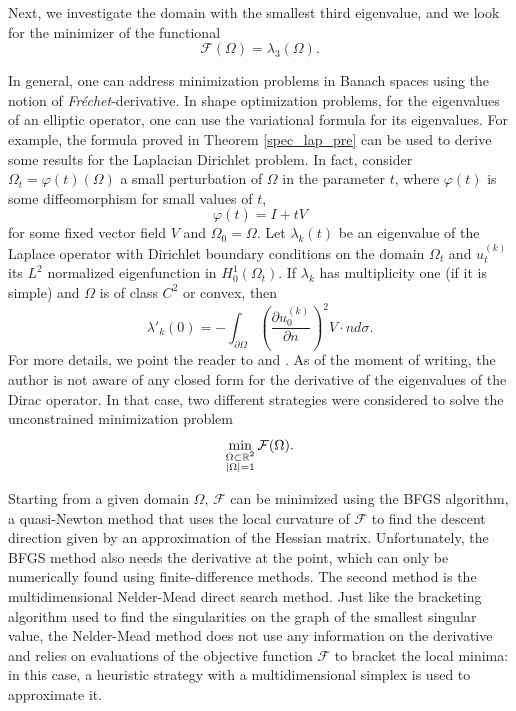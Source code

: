 Next, we investigate the domain with the smallest third eigenvalue, and we look for the minimizer of the functional
\begin{equation*}%
    \mathcal{F}(\Omega) = \lambda_3(\Omega).
\end{equation*}

In general, one can address minimization problems in Banach spaces using the notion of \textit{Fréchet}-derivative. In shape optimization problems, for the eigenvalues of an elliptic operator, one can use the variational formula for its eigenvalues. For example, the formula proved in Theorem \ref{spec_lap_pre} can be used to derive some results for the Laplacian Dirichlet problem. In fact, consider \(\Omega_t = \varphi(t)(\Omega)\) a small perturbation of \(\Omega\) in the parameter \(t\), where \(\varphi(t)\) is some diffeomorphism for small values of \(t\), 
\[
    \varphi(t) = I + t V
\]
for some fixed vector field \(V\) and \(\Omega_0 = \Omega\). Let  \(\lambda_k(t)\) be an eigenvalue of the Laplace operator with Dirichlet boundary conditions on the domain \(\Omega_t\) and \(u^{(k)}_t\) its \(L^2\) normalized eigenfunction in \(H^1_0(\Omega_t)\). If \(\lambda_k\) has multiplicity one (if it is simple) and \(\Omega\) is of class \(C^2\) or convex, then
\[
    \lambda'_k(0) =- \int_{\partial\Omega} \left(\frac{\partial u^{(k)}_0}{\partial n}\right)^2 V\cdot n d \sigma.
\]
For more details, we point the reader to \cite{henrot2006extremum} and \cite{kato2013perturbation}.
As of the moment of writing, the author is not aware of any closed form for the derivative of the eigenvalues of the Dirac operator. In that case, two different strategies were considered to solve the unconstrained minimization problem
\begin{equation}\label{dirac_unconstrained_min_lambda_3}
    \min_{\substack{\Omega \subset \mathbb{R}^2 \\ \abs{\Omega}=1}} \mathcal{F}(\Omega).
\end{equation}

Starting from a given domain \(\Omega\), \(\mathcal{F}\) can be minimized using the \ac{BFGS} algorithm, a quasi-Newton method that uses the local curvature of \(\mathcal{F}\) to find the descent direction given by an approximation of the Hessian matrix. Unfortunately, the \ac{BFGS} method also needs the derivative at the point, which can only be numerically found using finite-difference methods. The second method is the multidimensional Nelder-Mead direct search method. Just like the bracketing algorithm used to find the singularities on the graph of the smallest singular value, the Nelder-Mead method does not use any information on the derivative and relies on evaluations of the objective function \(\mathcal{F}\) to bracket the local minima: in this case, a heuristic strategy with a multidimensional simplex is used to approximate it.

